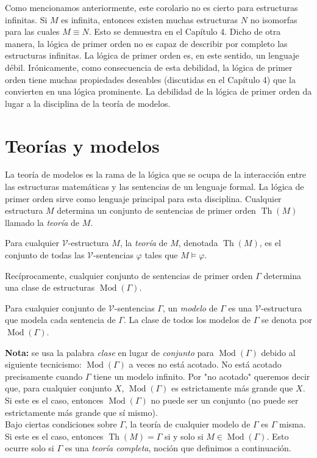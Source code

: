 \message{ !name(main.tex)}\documentclass[12pt,a4paper]{book}
\newcommand{\comillas}[1]{"#1"}
\newcommand{\VV}{\mathcal{V}}
\DeclareMathOperator{\Th}{Th}
\DeclareMathOperator{\Mod}{Mod}
\begin{document}
    Como mencionamos anteriormente, este corolario no es cierto para estructuras infinitas. Si $M$ es infinita, entonces
    existen muchas estructuras $N$ no isomorfas para las cuales $M\equiv N$. Esto se demuestra en el Capítulo 4. Dicho de
    otra manera, la lógica de primer orden no es capaz de describir por completo las estructuras infinitas. La lógica de
    primer orden es, en este sentido, un lenguaje débil. Irónicamente, como consecuencia de esta debilidad, la lógica de
    primer orden tiene muchas propiedades deseables (discutidas en el Capítulo 4) que la convierten en una lógica
    prominente. La debilidad de la lógica de primer orden da lugar a la disciplina de la teoría de modelos.

    \section{Teorías y modelos}

    La teoría de modelos es la rama de la lógica que se ocupa de la interacción entre las estructuras matemáticas y las
    sentencias de un lenguaje formal. La lógica de primer orden sirve como lenguaje principal para esta disciplina.
    Cualquier estructura $M$ determina un conjunto de sentencias de primer orden $\Th(M)$ llamado la \textit{teoría} de
    $M$.

    \begin{definicion}\label{def:teoria-de-M}
        Para cualquier $\VV$-estructura $M$, la \textit{teoría} de $M$, denotada $\Th(M)$, es el conjunto de todas las
        $\VV$-sentencias $\varphi$ tales que $M\models\varphi$.
    \end{definicion}

    Recíprocamente, cualquier conjunto de sentencias de primer orden $\Gamma$ determina una clase de estructuras
    $\Mod(\Gamma)$.

    \begin{definicion}[Modelo]\label{def:modelo-clase}
        Para cualquier conjunto de $\VV$-sentencias $\Gamma$, un \textit{modelo} de $\Gamma$ es una $\VV$-estructura que
        modela cada sentencia de $\Gamma$. La clase de todos los modelos de $\Gamma$ se denota por $\Mod(\Gamma)$.
    \end{definicion}

    \textbf{Nota:} se usa la palabra \textit{clase} en lugar de \textit{conjunto} para $\Mod(\Gamma)$ debido al siguiente
    tecnicismo: $\Mod(\Gamma)$ a veces no está acotado. No está acotado precisamente cuando $\Gamma$ tiene un modelo
    infinito. Por \comillas{no acotado} queremos decir que, para cualquier conjunto $X$, $\Mod(\Gamma)$ es estrictamente
    más grande que $X$. Si este es el caso, entonces $\Mod(\Gamma)$ no puede ser un conjunto (no puede ser estrictamente
    más grande que sí mismo).\\
    Bajo ciertas condiciones sobre $\Gamma$, la teoría de cualquier modelo de $\Gamma$ es $\Gamma$ misma. Si este es el
    caso, entonces $\Th(M)=\Gamma$ si y solo si $M\in\Mod(\Gamma)$. Esto ocurre solo si $\Gamma$ es una \textit{teoría
    completa}, noción que definimos a continuación.
\end{document}
